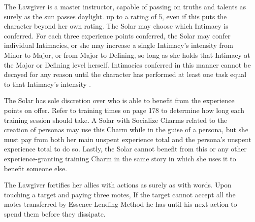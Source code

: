 
The Lawgiver is a master instructor, capable of passing on truths and talents
as surely as the sun passes daylight.  up to a rating of 5, even if this puts the character beyond her own
rating.  The Solar may choose which Intimacy is conferred.
For each three experience points conferred, the Solar may confer individual
Intimacies, or she may increase a single Intimacy's intensity from Minor to
Major, or from Major to Defining, so long as she holds that Intimacy at the
Major or Defining level herself. Intimacies conferred in this manner cannot be
decayed for any reason until the character has performed at least one task
equal to that Intimacy's intensity \parencite*[p.~215]{ex3}.

The Solar has sole discretion over who is able to benefit from the experience
points on offer. Refer to training times on page 178 to determine how long each
training session should take.  A Solar with Socialize Charms related
to the creation of personas may use this Charm while in the guise of a persona,
but she must pay from both her main unspent experience total and the persona's
unspent experience total to do so. Lastly, the Solar cannot benefit from this
or any other experience-granting training Charm in the same story in which she
uses it to benefit someone else.



The Lawgiver fortifies her allies with actions as surely as with words. Upon
touching a target and paying three motes,  If the target cannot accept all the motes transferred by
Essence-Lending Method he has until his next action to spend them before they
dissipate.




